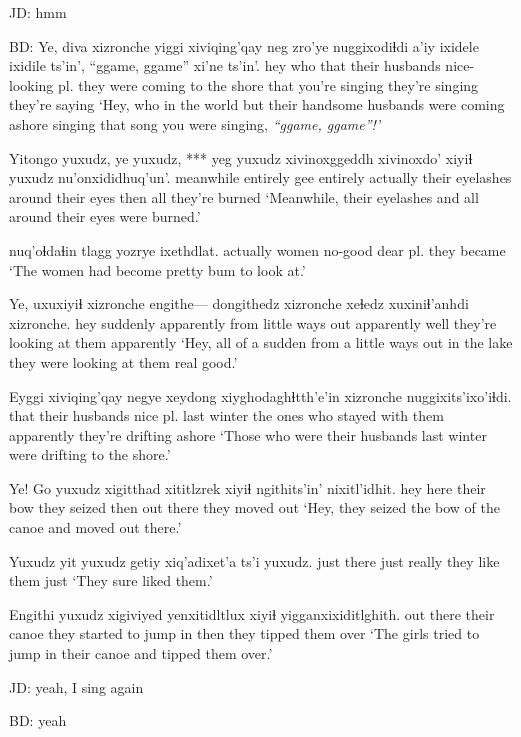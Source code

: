 \documentclass[12pt]{article}
\begin{document}
JD:  hmm

BD:
\gll Ye, diva xizronche yiggi xiviqing'qay {neg zro'ye} nuggixodiɬdi a'iy ixidele ixidile ts'in', {``ggame, ggame''} xi'ne ts'in'.
hey who  {} that {their husbands} {nice-looking pl.} {they were coming to the shore} that {you're singing} {they're singing} {}  {} {they're saying}
\glt `Hey, who in the world but their handsome husbands were coming ashore singing that song you were singing, \em{``ggame, ggame''}!'
\glend

\gll Yitongo yuxudz, ye yuxudz, *** {yeg yuxudz} xivinoxggeddh xivinoxdo' xiyiɬ yuxudz nu'onxididhuq'un'.
meanwhile entirely gee entirely {} actually {their eyelashes} {around their eyes} then all {they're burned}
\glt `Meanwhile, their eyelashes and all around their eyes were burned.'
\glend

 nuq'oɬdaɬin tlagg yozrye ixethdlat.
actually            women       no-good {dear pl.}  {they became}
\glt `The women had become pretty bum to look at.'
\glend

\gll Ye, uxuxiyiɬ xizronche engithe--- dongithedz xizronche xeɬedz xuxiniɬ'anhdi xizronche.
hey suddenly apparently {} {from little ways out} apparently well {they're looking at them} apparently
\glt `Hey, all of a sudden from a little ways out in the lake they were looking at them real good.'
\glend

\gll Eyggi xiviqing'qay negye xeydong xiyghodaghɬtth'e'in xizronche nuggixits'ixo'iɬdi.
that {their husbands} {nice pl.} {last winter} {the ones who stayed with them} apparently {they're drifting ashore}
\glt `Those who were their husbands last winter were drifting to the shore.'
\glend 

\gll Ye! Go yuxudz {xigitthad} xititlzrek xiyiɬ ngithits'in' nixitl'idhit.
hey here {} {their bow} {they seized} then {out there} {they moved out}
\glt `Hey, they seized the bow of the canoe and moved out there.'
\glend

\gll Yuxudz yit yuxudz getiy xiq'adixet'a ts'i yuxudz.
just   there just really {they like them} just
\glt `They sure liked them.'
\glend

\gll Engithi yuxudz xigiviyed yenxitidltlux xiyiɬ yigganxixiditlghith. 
{out there} {} {their canoe} {they started to jump in} then {they tipped them over}
\glt `The girls tried to jump in their canoe and tipped them over.'
\glend

JD:  yeah, I sing again

BD:  yeah
\end{document}
